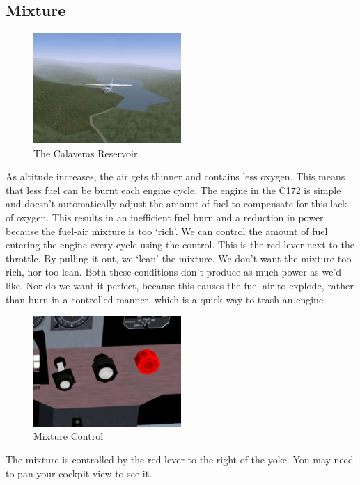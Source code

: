 \subsection{Mixture}

\begin{figure}[!htp]
\centering
\includegraphics[width=0.5\textwidth]{calaveras2}
\caption{The Calaveras Reservoir}
\end{figure}

As altitude increases, the air gets thinner and contains less oxygen. This means that less fuel can be burnt each engine cycle. The engine in the C172 is simple and doesn't automatically adjust the amount of fuel to compensate for this lack of oxygen. This results in an inefficient fuel burn and a reduction in power because the fuel-air mixture is too `rich'. We can control the amount of fuel entering the engine every cycle using the  control. This is the red lever next to the throttle. By pulling it out, we `lean' the mixture. We don't want the mixture too rich, nor too lean. Both these conditions don't produce as much power as we'd like. Nor do we want it perfect, because this causes the fuel-air to explode, rather than burn in a controlled manner, which is a quick way to trash an engine.

\begin{figure}[!htp]
\centering
\includegraphics[width=0.5\textwidth]{mixture}
\caption{Mixture Control\label{mixture}}
\end{figure}

The mixture is controlled by the red lever to the right of the yoke. You may need to pan your cockpit view to see it. 

